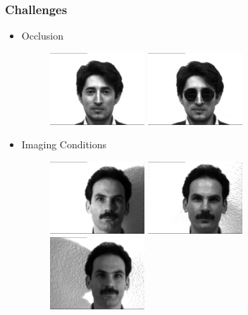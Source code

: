 \documentclass[10pt]{beamer}
\begin{document}
\begin{frame}
    \frametitle{Challenges}
   \begin{itemize}
   \item Occlusion
     \begin{figure}
     \begin{minipage}[t]{0.35\linewidth} 
     \centering 
     \includegraphics[width=1.4in]{noglass.jpg} 
   \end{minipage}
   \begin{minipage}[t]{0.35\linewidth} 
     \centering 
     \includegraphics[width=1.4in]{glass.jpg} 
   \end{minipage} 
   \end{figure}
   \end{itemize}
   \begin{itemize}
   \item Imaging Conditions
     \begin{figure}
     \begin{minipage}[t]{0.32\linewidth} 
     \centering 
     \includegraphics[width=1.4in]{left.jpg} 
   \end{minipage}
   \begin{minipage}[t]{0.32\linewidth} 
     \centering 
     \includegraphics[width=1.4in]{normal.jpg} 
   \end{minipage} 
   \begin{minipage}[t]{0.32\linewidth} 
     \centering 
     \includegraphics[width=1.4in]{right.jpg} 
   \end{minipage} 
   \end{figure}
   \end{itemize}
\end{frame}
\end{document}
